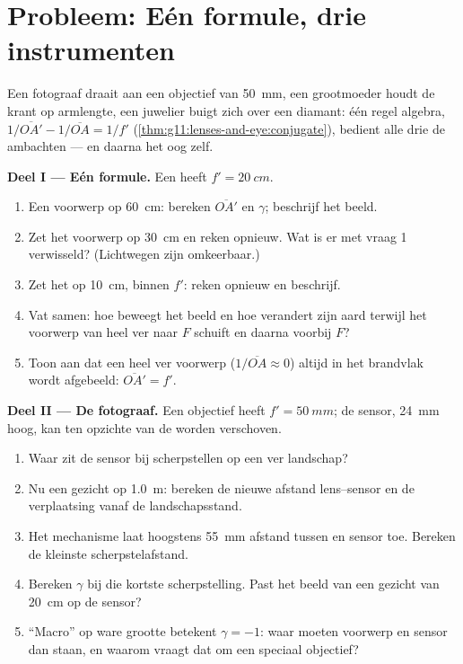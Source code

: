 \section{Probleem: Eén formule, drie instrumenten}

\begin{problem}
\label{pb:g11:lenses-and-eye:1}
Een fotograaf draait aan een objectief van \qty{50}{mm}, een grootmoeder
houdt de krant op armlengte, een juwelier buigt zich over een diamant:
één regel algebra, $1/\overline{OA'} - 1/\overline{OA} = 1/f'$
(\cref{thm:g11:lenses-and-eye:conjugate}), bedient alle drie de
ambachten --- en daarna het oog zelf.

\medskip
\noindent\textbf{Deel I --- Eén formule.} Een  heeft
$f' = \qty{20}{cm}$.
\begin{enumerate}
  \item Een voorwerp op \qty{60}{cm}: bereken $\overline{OA'}$ en
        $\gamma$; beschrijf het beeld.
  \item Zet het voorwerp op \qty{30}{cm} en reken opnieuw. Wat is er met
        vraag 1 verwisseld? (Lichtwegen zijn omkeerbaar.)
  \item Zet het op \qty{10}{cm}, binnen $f'$: reken opnieuw en beschrijf.
  \item Vat samen: hoe beweegt het beeld en hoe verandert zijn aard
        terwijl het voorwerp van heel ver naar $F$ schuift en daarna
        voorbij $F$?
  \item Toon aan dat een heel ver voorwerp ($1/\overline{OA} \approx 0$)
        altijd in het brandvlak wordt afgebeeld: $\overline{OA'} = f'$.
\end{enumerate}

\medskip
\noindent\textbf{Deel II --- De fotograaf.}
Een objectief heeft $f' = \qty{50}{mm}$; de sensor, \qty{24}{mm} hoog,
kan ten opzichte van de  worden verschoven.
\begin{enumerate}[resume]
  \item Waar zit de sensor bij scherpstellen op een ver landschap?
  \item Nu een gezicht op \qty{1.0}{m}: bereken de nieuwe afstand
        lens--sensor en de verplaatsing vanaf de landschapsstand.
  \item Het mechanisme laat hoogstens \qty{55}{mm} afstand tussen  en
        sensor toe. Bereken de kleinste scherpstelafstand.
  \item Bereken $\gamma$ bij die kortste scherpstelling. Past het beeld
        van een gezicht van \qty{20}{cm} op de sensor?
  \item ``Macro'' op ware grootte betekent $\gamma = -1$: waar moeten
        voorwerp en sensor dan staan, en waarom vraagt dat om een
        speciaal objectief?
\end{enumerate}


\end{problem}
